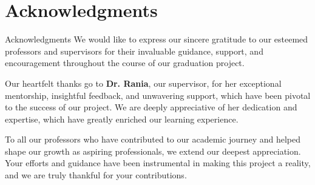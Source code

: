 

\chapter*{Acknowledgments}
{Acknowledgments} 
We would like to express our sincere gratitude to our esteemed professors 
and supervisors for their invaluable guidance, support, and encouragement 
throughout the course of our graduation project. 

Our heartfelt thanks go to \textbf{Dr. Rania}, our supervisor, for her exceptional 
mentorship, insightful feedback, and unwavering support, which have been 
pivotal to the success of our project. We are deeply appreciative of her 
dedication and expertise, which have greatly enriched our learning 
experience. 

To all our professors who have contributed to our academic journey and 
helped shape our growth as aspiring professionals, we extend our deepest 
appreciation. Your efforts and guidance have been instrumental in making 
this project a reality, and we are truly thankful for your contributions.
